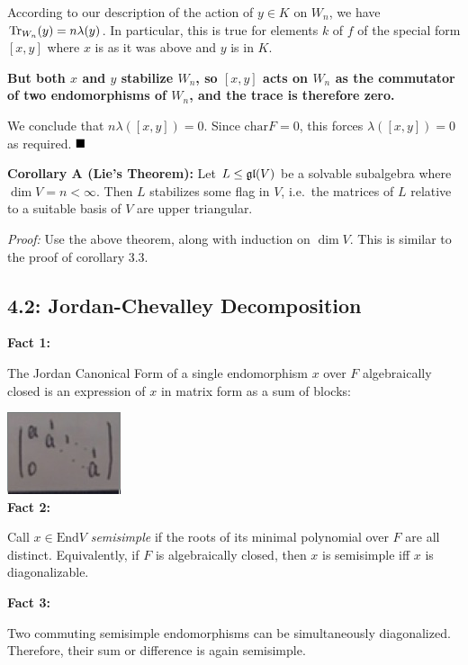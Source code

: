 According to our description of the action of \(y\in K\) on \(W_n\), we
have \(\mathrm{Tr}_{W_n}(y) = n\lambda(y)\). In particular, this is true for
elements \(k\) of \(f\) of the special form \([x, y]\) where \(x\) is as
it was above and \(y\) is in \(K\).

\textbf{But both \(x\) and \(y\) stabilize \(W_n\), so \([x, y]\) acts
on \(W_n\) as the commutator of two endomorphisms of \(W_n\), and the
trace is therefore zero.}

We conclude that \(n\lambda([x, y]) = 0\). Since
\(\mathrm{char} F = 0\), this forces \(\lambda([x, y]) = 0\) as
required. \(\qed\)

\textbf{Corollary A (Lie's Theorem):} Let \(L \leq {\mathfrak{gl}}(V)\) be a
solvable subalgebra where \(\dim V = n < \infty\). Then \(L\) stabilizes
some flag in \(V\), i.e.~the matrices of \(L\) relative to a suitable
basis of \(V\) are upper triangular.

\emph{Proof:} Use the above theorem, along with induction on \(\dim V\).
This is similar to the proof of corollary 3.3.

\hypertarget{jordan-chevalley-decomposition}{%
\subsection{4.2: Jordan-Chevalley
Decomposition}\label{jordan-chevalley-decomposition}}

\textbf{Fact 1:}

The Jordan Canonical Form of a single endomorphism \(x\) over \(F\)
algebraically closed is an expression of \(x\) in matrix form as a sum
of blocks:

\includegraphics{figures/2019-09-29-20:34.png}\\

\textbf{Fact 2:}

Call \(x\in \mathrm{End} V\) \emph{semisimple} if the roots of its
minimal polynomial over \(F\) are all distinct. Equivalently, if \(F\)
is algebraically closed, then \(x\) is semisimple iff \(x\) is
diagonalizable.

\textbf{Fact 3:}

Two commuting semisimple endomorphisms can be simultaneously
diagonalized. Therefore, their sum or difference is again semisimple.

